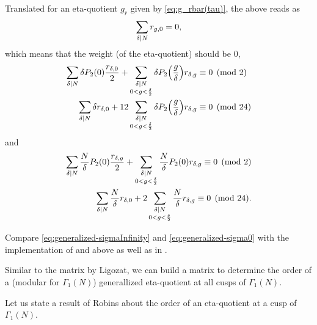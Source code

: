 \documentclass{article}
\begin{document}
Translated for an eta-quotient $g_{\bar{r}}$ given by
\eqref{eq:g_rbar(tau)}, the above reads as
\begin{align}
  \sum_{\delta \mid N} r_{g,0} = 0,
  \label{eq:generalized-weight}
\end{align}
which means that the weight (of the eta-quotient) should be 0,
\begin{align}
  \sum_{\delta \mid N}
  \delta P_2(0) \frac{r_{\delta,0}}{2}
  +
  \sum_{\substack{\delta \mid N\\0 < g < \frac{\delta}{2}}}
  \delta P_2\Bigl(\frac{g}{\delta}\Bigr) r_{\delta,g}
  &\equiv 0 \pmod{2}    \notag\\
  \sum_{\delta \mid N}
  \delta r_{\delta,0}
  +
  12 \sum_{\substack{\delta \mid N\\0 < g < \frac{\delta}{2}}}
  \delta P_2\Bigl(\frac{g}{\delta}\Bigr) r_{\delta,g}
  &\equiv 0 \pmod{24}
  \label{eq:generalized-sigmaInfinity}
\end{align}
and
\begin{align}
\sum_{\delta \mid N}
  \frac{N}{\delta} P_2(0) \frac{r_{\delta,g}}{2}
  +
  \sum_{\substack{\delta \mid N\\0 < g < \frac{\delta}{2}}}
  \frac{N}{\delta} P_2(0) r_{\delta,g} \equiv 0 \pmod{2}  \notag\\
  \sum_{\delta \mid N}
  \frac{N}{\delta} r_{\delta,0}
  +
  2 \sum_{\substack{\delta \mid N\\0 < g < \frac{\delta}{2}}}
  \frac{N}{\delta} r_{\delta,g} \equiv 0 \pmod{24}.
  \label{eq:generalized-sigma0}
\end{align}

Compare \eqref{eq:generalized-sigmaInfinity} and
\eqref{eq:generalized-sigma0} with the implementation of
 and  above as well as
 in .


Similar to the matrix by Ligozat, we can build a matrix to determine
the order of a (modular for $\Gamma_1(N)$) generallized eta-quotient
at all cusps of $\Gamma_1(N)$.


Let us state a result of Robins about the order of an eta-quotient at
a cusp of $\Gamma_1(N)$.
\end{document}
